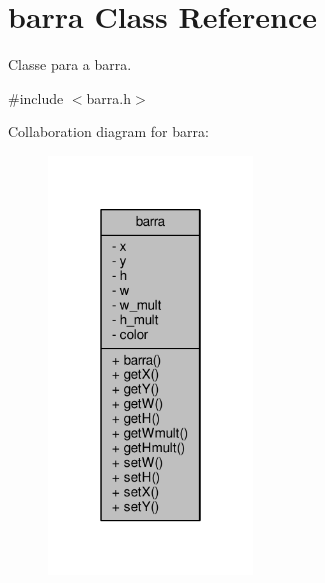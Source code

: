 \hypertarget{classbarra}{}\section{barra Class Reference}
\label{classbarra}


Classe para a barra.  




{\ttfamily \#include $<$barra.\+h$>$}



Collaboration diagram for barra\+:
\nopagebreak
\begin{figure}[H]
\begin{center}
\leavevmode
\includegraphics[width=154pt]{classbarra__coll__graph}
\end{center}
\end{figure}

